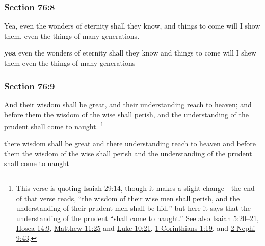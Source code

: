 	\subsubsection{Section 76:8} %
		\label{DC76-8}

		Yea, even the wonders of eternity shall they know, and things to come will I show them, even the things of many generations.

		\begin{framed}
		\scriptsize
			\begin{compactdesc}
				\item[JSP] \textbf{yea} even the wonders of eternity shall they know and things to come will I shew them even the things of many generations
			\end{compactdesc}
		\end{framed}

	\subsubsection{Section 76:9} %
		\label{DC76-9}

		And their wisdom shall be great, and their understanding reach to heaven; and before them the wisdom of the wise shall perish, and the understanding of the prudent shall come to naught.%
			\footnote{%
				\label{DC76-9-prudent}%
				This verse is quoting \hyperref[ISAIAH-29-14]{Isaiah 29:14}, though it makes a slight change---the end of that verse reads, ``the wisdom of their wise men shall perish, and the understanding of their prudent men shall be hid,'' but here it says that the understanding of the prudent ``shall come to naught.'' See also \hyperref[ISAIAH-5-20]{Isaiah 5:20--21}, \hyperref[HOSEA-14-9]{Hosea 14:9}, \hyperref[MATTHEW-11-25]{Matthew 11:25} and \hyperref[LUKE-10-21]{Luke 10:21}, \hyperref[1CORINTHIANS-1-19]{1 Corinthians 1:19}, and \hyperref[2NEPHI-9-43]{2 Nephi 9:43}.
				}

		\begin{framed}
		\scriptsize
			\begin{compactdesc}
				\item[JSP] there wisdom shall be great and there understanding reach to heaven and before them the wisdom of the wise shall perish and the understanding of the prudent shall come to naught
			\end{compactdesc}
		\end{framed}

